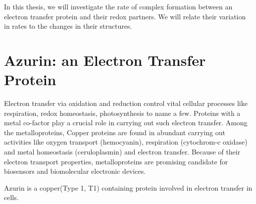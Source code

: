 In this thesis, we will investigate the rate of complex formation between an electron transfer protein and their redox partners. We will relate their variation in rates to the changes in their structures.

\section{Azurin: an Electron Transfer Protein}
Electron transfer via oxidation and reduction control vital cellular processes like respiration, redox homeostasis, photosynthesis to name a few.
Proteins with a metal co-factor play a crucial role in carrying out such electron transfer.
Among the metalloproteins, Copper proteins are found in abundant carrying out activities like oxygen transport (hemocyanin), respiration (cytochrom-c oxidase) and metal homeostasis (ceruloplasmin) and electron transfer.
Because of their electron transport properties, metalloproteins are promising candidate for biosensors and biomolecular electronic devices.

Azurin is a copper(Type 1, T1) containing protein involved in electron transfer in cells.\cite{dennison2005investigating,kolczak2006handbook}

